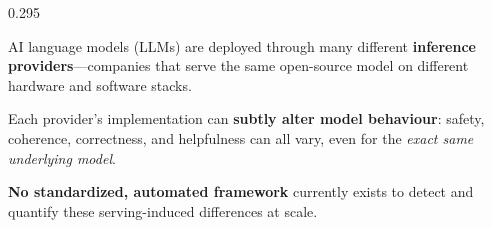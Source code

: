 \documentclass[final]{beamer}
\begin{document}
\begin{frame}[t]
\begin{columns}[c,totalwidth=\linewidth]
\end{columns}

\vspace{1.5cm}

\begin{columns}[T,totalwidth=\linewidth]

\begin{column}{0.295\linewidth}

  \begin{tcolorbox}[sectionbox,title={The Problem}]
    {\fontsize{20}{26}\selectfont\color{bodytext}

    AI language models (LLMs) are deployed through many different
    \textbf{inference providers}---companies that serve the same
    open-source model on different hardware and software stacks.

    \vspace{0.4cm}
    Each provider's implementation can \textbf{subtly alter model
    behaviour}: safety, coherence, correctness, and helpfulness can
    all vary, even for the \emph{exact same underlying model}.

    \vspace{0.4cm}
    \textbf{No standardized, automated framework} currently exists
    to detect and quantify these serving-induced differences at scale.
    }

    \vspace{0.4cm}


\end{tcolorbox}
\end{column}
\end{columns}
\end{frame}
\end{document}
